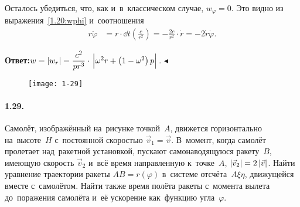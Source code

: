 \documentclass{weekly}
\begin{document}
Осталось убедиться, что, как и~в~классическом случае, $w_\varphi = 0$.
Это видно из выражения~\eqref{1.20:wphi} и~соотношения
\begin{align}
    r \ddot\varphi &= r \cdot \dd{}{t} \left( \frac{c}{r^2} \right)
        = -\frac{2c}{r^2} \cdot \dot r = -2 \dot r \dot\varphi.
\end{align}

\textbf{Ответ:}\quad $w = \left| w_r \right| = \dfrac{c^2}{pr^3} \cdot
\left.\Big| \omega^2 r + \left( 1-\omega^2 \right) p \Big|\right.$.
\hfill $\blacktriangleleft$

\clearpage

\begin{wrapfigure}[6]{r}{5cm}\vspace{1mm}
    \texttt{[image: 1-29]}
\end{wrapfigure}
\paragraph{1.29.} Самолёт, изображённый на~рисунке точкой~$A$,
движется горизонтально на~высоте~$H$ с~постоянной скоростью
$\vec v_1 = \vec v$. В~момент, когда самолёт пролетает над~ракетной
установкой, пускают самонаводящуюся ракету~$B$, имеющую скорость
$\vec v_2$ и~всё время направленную к~точке~$A$, $\left| \vec v_2 \right| =
2\left| \vec{v} \right|$. Найти уравнение траектории ракеты $AB = r(\varphi)$
в~системе отсчёта~$A\xi\eta$, движущейся вместе с~самолётом.
Найти также время полёта ракеты с~момента вылета до~поражения
самолёта и~её ускорение как~функцию угла~$\varphi$.
\end{document}
